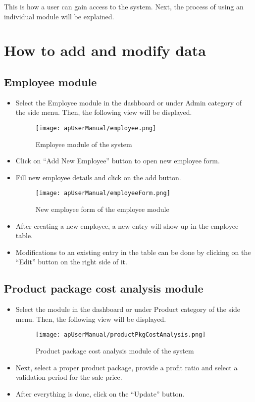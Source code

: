 \documentclass[12pt]{report}
\begin{document}
This is how a user can gain access to the system. Next, the process of using an individual module will be explained.

\section{How to add and modify data}

\subsection{Employee module}
\begin{itemize}
	\item Select the Employee module in the dashboard or under Admin category of the side menu. Then, the following view will be displayed.
	      \begin{figure}[H]
		      \centering
		      \texttt{[image: apUserManual/employee.png]}
		      \caption{Employee module of the system}
	      \end{figure}

	\item Click on ``Add New Employee'' button to open new employee form.

	\item Fill new employee details and click on the add button.
	      \begin{figure}[H]
		      \centering
		      \texttt{[image: apUserManual/employeeForm.png]}
		      \caption{New employee form of the employee module}
	      \end{figure}

	\item After creating a new employee, a new entry will show up in the employee table.

	\item Modifications to an existing entry in the table can be done by clicking on the ``Edit'' button on the right side of it.

\end{itemize}

\subsection{Product package cost analysis module}

\begin{itemize}
	\item Select the module in the dashboard or under Product category of the side menu. Then, the following view will be displayed.
	      \begin{figure}[H]
		      \centering
		      \texttt{[image: apUserManual/productPkgCostAnalysis.png]}
		      \caption{Product package cost analysis module of the system}
	      \end{figure}

	\item Next, select a proper product package, provide a profit ratio and select a validation period for the sale price.
	\item After everything is done, click on the ``Update'' button.
\end{itemize}
\end{document}
